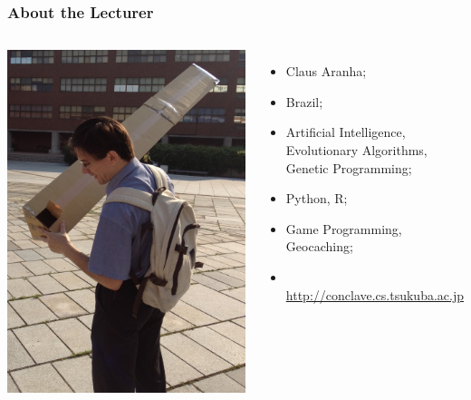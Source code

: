 \documentclass{beamer}
\begin{document}
\begin{frame}
  \frametitle{About the Lecturer}
  \begin{columns}
    \includegraphics[width=1\textwidth]{../img/pinhole}
    {\small
    \begin{itemize}
      \item {} Claus Aranha;
      \item {} Brazil;

        \medskip

      \item {} Artificial Intelligence,
        Evolutionary Algorithms, Genetic Programming;
      \item {} Python, R;
      \item {} Game Programming, Geocaching;

        \medskip

      \item {}\\ {\smaller \url{http://conclave.cs.tsukuba.ac.jp}}
    \end{itemize}
    }
  \end{columns}
\end{frame}
\end{document}
